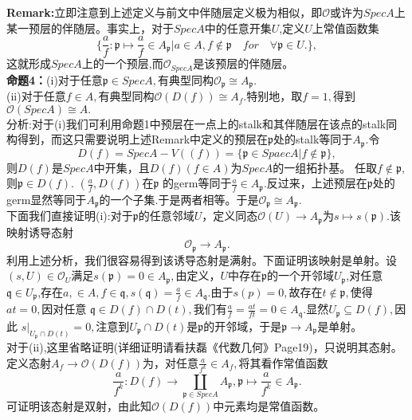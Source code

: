 \documentclass[UTF8]{article}
\begin{document}
\textbf{Remark:}立即注意到上述定义与前文中伴随层定义极为相似，即$\mathcal{O}$或许为$SpecA$上某一预层的伴随层。事实上，对于$SpecA$中的任意开集$U$,定义$U$上常值函数集
$$\{\frac{a}{f}:\mathfrak{p}\mapsto \frac{a}{f}\in A_{\mathfrak{p}}|a\in A,f\notin \mathfrak{p}\quad for \quad \forall \mathfrak{p}\in U . \},$$
这就形成$SpecA$上的一个预层,而$\mathcal{O}_{SpecA}$是该预层的伴随层。\\

\textbf{命题4：}(i)对于任意$\mathfrak{p}\in SpecA,$有典型同构$\mathcal{O}_{\mathfrak{p}}\cong A_{\mathfrak{p}}.$\\
(ii)对于任意$f\in A,$有典型同构$\mathcal{O}(D(f))\cong A_{f}.$特别地，取$f=1,$得到$\mathcal{O}(SpecA)\cong A.$\\

 分析:对于(i)我们可利用命题1中预层在一点上的stalk和其伴随层在该点的stalk同构得到，而这只需要说明上述Remark中定义的预层在$\mathfrak{p}$处的stalk等同于$A_{\mathfrak{p}}.$令$$D(f)=SpecA-V((f))=\{\mathfrak{p}\in SpaecA|f\notin \mathfrak{p}\},$$
 则$D(f)$是$SpecA$中开集，且$D(f)(f\in A)$为$SpecA$的一组拓扑基。
 任取$f\notin \mathfrak{p},$则$\mathfrak{p}\in D(f)$.
 $(\frac{a}{f},D(f))$在$\mathfrak{p}$
 的germ等同于$\frac{a}{f}\in A_{\mathfrak{p}}.$反过来，上述预层在$\mathfrak{p}$处的germ显然等同于$A_{\mathfrak{p}}$的一个子集.于是两者相等。于是$\mathcal{O}_{\mathfrak{p}}\cong A_{\mathfrak{p}}.$\\
下面我们直接证明(i):对于$\mathfrak{p}$的任意邻域$U$，定义同态$\mathcal{O}(U)\rightarrow A_{\mathfrak{p}}$为$s\mapsto s(\mathfrak{p}).$该映射诱导态射
$$
\mathcal{O}_{\mathfrak{p}}\rightarrow A_{\mathfrak{p}}.
$$
利用上述分析，我们很容易得到该诱导态射是满射。下面证明该映射是单射。设$(s,U)\in \mathcal{O}_{U}$满足$s(\mathfrak{p})=0\in A_{\mathfrak{p}},$由定义，$U$中存在$\mathfrak{p}$的一个开邻域$U_{\mathfrak{p}}$,对任意$\mathfrak{q}\in U_{\mathfrak{p}}$,存在$a,\in A,f\in \mathfrak{q},s(\mathfrak{q})=\frac{a}{f}\in A_{\mathfrak{q}}.$由于$s(p)=0,$故存在$t\notin \mathfrak{p},$使得$at=0,$因对任意
$\mathfrak{q}\in D(f)\cap D(t),$我们有$\frac{a}{f}=\frac{at}{ft}=0\in A_{\mathfrak{q}}.$显然$U_{\mathfrak{p}}\subseteq D(f),$因此
$s|_{U_{\mathfrak{p}}\cap D(t)}=0,$注意到$U_{\mathfrak{p}}\cap D(t)$是$\mathfrak{p}$的开邻域，于是$\mathfrak{p}\rightarrow A_{\mathfrak{p}}$是单射。\\
对于(ii),这里省略证明(详细证明请看扶磊《代数几何》Page19)，只说明其态射。定义态射$A_{f}\rightarrow\mathcal{O}(D(f))$为，对任意$\frac{a}{f^{k}}\in A_{f},$将其看作常值函数
$$
\frac{a}{f^{k}}:D(f)\rightarrow \coprod_{\mathfrak{p}\in SpecA}A_{\mathfrak{p}},\mathfrak{p}\mapsto \frac{a}{f^{k}}\in A_{\mathfrak{p}}.
$$
可证明该态射是双射，由此知$\mathcal{O}(D(f))$中元素均是常值函数。\\
\end{document}
